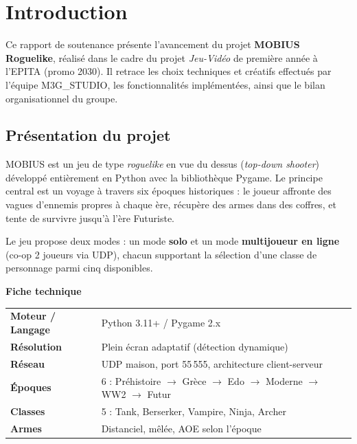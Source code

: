 \documentclass[12pt,a4paper]{article}
\begin{document}
\tableofcontents
\newpage

\section{Introduction}

Ce rapport de soutenance présente l'avancement du projet \textbf{MOBIUS Roguelike}, réalisé dans le cadre du projet \textit{Jeu-Vidéo} de première année à l'EPITA (promo 2030). Il retrace les choix techniques et créatifs effectués par l'équipe M3G\_STUDIO, les fonctionnalités implémentées, ainsi que le bilan organisationnel du groupe.

\subsection{Présentation du projet}

MOBIUS est un jeu de type \textit{roguelike} en vue du dessus (\textit{top-down shooter}) développé entièrement en Python avec la bibliothèque Pygame. Le principe central est un voyage à travers six époques historiques : le joueur affronte des vagues d'ennemis propres à chaque ère, récupère des armes dans des coffres, et tente de survivre jusqu'à l'ère Futuriste.

Le jeu propose deux modes : un mode \textbf{solo} et un mode \textbf{multijoueur en ligne} (co-op 2 joueurs via UDP), chacun supportant la sélection d'une classe de personnage parmi cinq disponibles.

\begin{infobox}
\textbf{Fiche technique}\\[6pt]
\begin{tabular}{@{}ll@{}}
  \textbf{Moteur / Langage} & Python 3.11+ / Pygame 2.x \\[2pt]
  \textbf{Résolution}       & Plein écran adaptatif (détection dynamique) \\[2pt]
  \textbf{Réseau}           & UDP maison, port 55\,555, architecture client-serveur \\[2pt]
  \textbf{Époques}          & 6 : Préhistoire $\to$ Grèce $\to$ Edo $\to$ Moderne $\to$ WW2 $\to$ Futur \\[2pt]
  \textbf{Classes}          & 5 : Tank, Berserker, Vampire, Ninja, Archer \\[2pt]
  \textbf{Armes}            & Distanciel, mêlée, AOE selon l'époque \\
\end{tabular}
\end{infobox}
\end{document}
